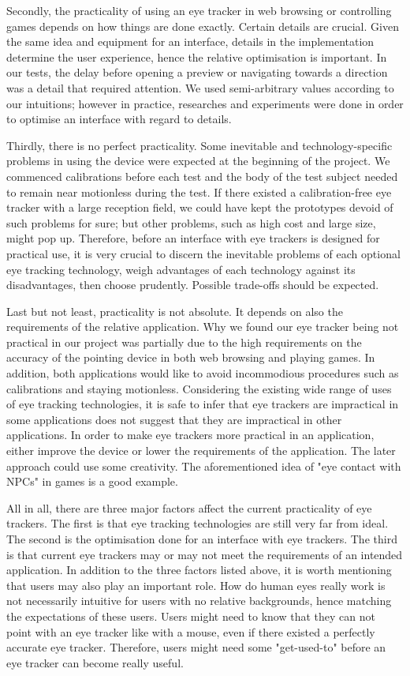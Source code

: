 \documentclass[english]{tktltiki}
\begin{document}
Secondly, the practicality of using an eye tracker in web browsing or controlling games depends on how things are done exactly. Certain details are crucial. Given the same idea and equipment for an interface, details in the implementation determine the user experience, hence the relative optimisation is important. In our tests, the delay before opening a preview or navigating towards a direction was a detail that required attention. We used semi-arbitrary values according to our intuitions; however in practice, researches and experiments were done in order to optimise an interface with regard to details.

Thirdly, there is no perfect practicality. Some inevitable and technology-specific problems in using the device were expected  at the beginning of the project. We commenced calibrations before each test and the body of the test subject needed to remain near motionless during the test. If there existed a calibration-free eye tracker with a large reception field, we could have kept the prototypes devoid of such problems for sure; but other problems, such as high cost and large size, might pop up. Therefore, before an interface with eye trackers is designed for practical use, it is very crucial to discern the inevitable problems of each optional eye tracking technology, weigh advantages of each technology against its disadvantages, then choose prudently. Possible trade-offs should be expected.

Last but not least, practicality is not absolute. It depends on also the requirements of the relative application. Why we found our eye tracker being not practical in our project was partially due to the high requirements on the accuracy of the pointing device in both web browsing and playing games. In addition, both applications would like to avoid incommodious procedures such as calibrations and staying motionless. Considering the existing wide range of uses of eye tracking technologies, it is safe to infer that eye trackers are impractical in some applications does not suggest that they are impractical in other applications. In order to make eye trackers more practical in an application, either improve the device or lower the requirements of the application. The later approach could use some creativity. The aforementioned idea of "eye contact with NPCs" in games is a good example. 

All in all, there are three major factors affect the current practicality of eye trackers. The first is that eye tracking technologies are still very far from ideal. The second is the optimisation done for an interface with eye trackers. The third is that current eye trackers may or may not meet the requirements of an intended application. In addition to the three factors listed above, it is worth mentioning that users may also play an important role. How do human eyes really work is not necessarily intuitive for users with no relative backgrounds, hence matching the expectations of these users. Users might need to know that they can not point with an eye tracker like with a mouse, even if there existed a perfectly accurate eye tracker. Therefore, users might need some "get-used-to" before an eye tracker can become really useful. 
\end{document}

